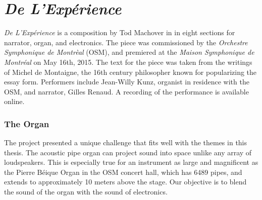 \clearpage
\chapter{\textit{De L'Exp\'{e}rience}}
\label{ch:experience}

\textit{De L'Exp\'{e}rience} is a composition by Tod Machover in in
eight sections for narrator, organ, and electronics. The piece was
commissioned by the \textit{Orchestre Symphonique de Montr\`{e}al}
(OSM), and premiered at the \textit{Maison Symphonique de
  Montr\'{e}al} on May 16th, 2015. The text for the piece was taken
from the writings of Michel de Montaigne, the 16th century philosopher
known for popularizing the essay form.  Performers include Jean-Willy
Kunz, organist in residence with the OSM, and narrator, Gilles
Renaud. A recording of the performance is available
online.


\subsection{The Organ}
\label{sec:organ}
The project presented a unique challenge that fits well with the
themes in this thesis. The acoustic pipe organ can project sound into
space unlike any array of loudspeakers. This is especially true for an
instrument as large and magnificent as the Pierre B\'{e}ique Organ in
the OSM concert hall, which has 6489 pipes, and extends to
approximately 10 meters above the stage. Our objective is to blend
the sound of the organ with the sound of electronics. 

